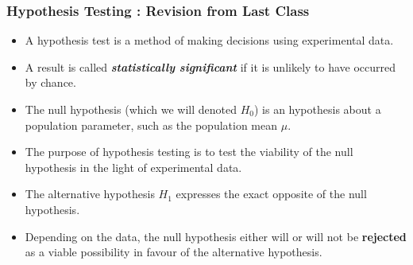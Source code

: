 





\begin{frame}
\frametitle{Hypothesis Testing : Revision from Last Class}
\large
\begin{itemize} \item
A hypothesis test is a method of making decisions using experimental data. \item A result is called \textbf{\emph{statistically significant}} if it is unlikely to have occurred by chance.





\item The null hypothesis (which we will denoted $H_0$) is an hypothesis about a population parameter, such as the population mean $\mu$. \item The purpose of hypothesis testing is to test the viability of the null hypothesis in the light of experimental data. \item The alternative hypothesis $H_1$ expresses the exact opposite of the null hypothesis. \item Depending on the data, the null hypothesis either will or will not be \textbf{rejected} as a viable possibility in favour of the alternative hypothesis.
\end{itemize}

\end{frame}







